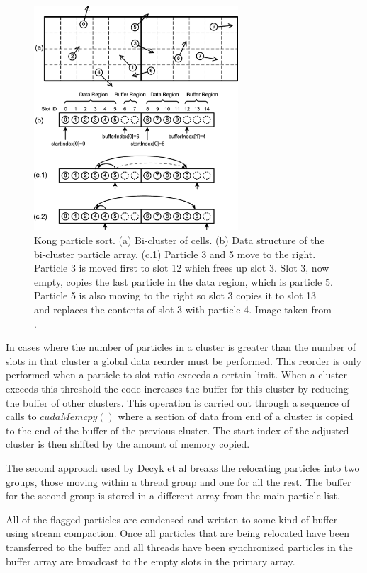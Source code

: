 \begin{figure}
\begin{center}
\includegraphics[width=3in]{design/kong_sort.png}
\end{center}
\caption{Kong particle sort. (a) Bi-cluster of cells. (b) Data structure of the bi-cluster particle array. (c.1) Particle 3 and 5 move to the right. Particle 3 is moved first to slot 12 which frees up slot 3. Slot 3, now empty, copies the last particle in the data region, which is particle 5. Particle 5 is also moving to the right so slot 3 copies it to slot 13 and replaces the contents of slot 3 with particle 4. Image taken from \cite{Kong2011}.}
\label{fig:kong_sort}
\end{figure}

	In cases where the number of particles in a cluster is greater than the number of slots in that cluster a global data reorder must be performed. This reorder is only performed when a particle to slot ratio exceeds a certain limit. When a cluster exceeds this threshold the code increases the buffer for this cluster by reducing the buffer of other clusters. This operation is carried out through a sequence of calls to $cudaMemcpy()$ where a section of data from end of a cluster is copied to the end of the buffer of the previous cluster. The start index of the adjusted cluster is then shifted by the amount of memory copied. \cite{Kong2011} 

  The second approach used by Decyk et al breaks the relocating particles into two groups, those moving within a thread group and one for all the rest. The buffer for the second group is stored in a different array from the main particle list.

All of the flagged particles are condensed and written to some kind of buffer using stream compaction. Once all particles that are being relocated have been transferred to the buffer and all threads have been synchronized particles in the buffer array are broadcast to the empty slots in the primary array. 













